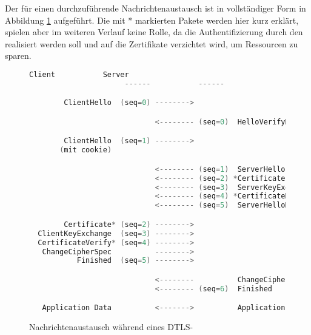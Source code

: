 Der für einen  durchzuführende Nachrichtenaustausch ist in vollständiger Form in Abbildung \ref{fig:handshake} aufgeführt.
Die mit * markierten Pakete werden hier kurz erklärt, spielen aber im weiteren Verlauf keine Rolle, da die Authentifizierung durch
den  realisiert werden soll und auf die Zertifikate verzichtet wird, um Ressourcen zu sparen.

\begin{figure}[ht]
  \centering
  \begin{lstlisting}[language=c]
                      Client           Server
                      ------           ------

        ClientHello  (seq=0) -------->

                             <-------- (seq=0)  HelloVerifyRequest    // Nur bei DTLS

        ClientHello  (seq=1) -------->                                // Nur bei DTLS
       (mit cookie)                                                   // Nur bei DTLS

                             <-------- (seq=1)  ServerHello
                             <-------- (seq=2) *Certificate
                             <-------- (seq=3)  ServerKeyExchange
                             <-------- (seq=4) *CertificateRequest
                             <-------- (seq=5)  ServerHelloDone

        Certificate* (seq=2) -------->
  ClientKeyExchange  (seq=3) -------->
  CertificateVerify* (seq=4) -------->
   ChangeCipherSpec          -------->
           Finished  (seq=5) -------->

                             <--------          ChangeCipherSpec
                             <-------- (seq=6)  Finished  

   Application Data          <------->          Application Data
  \end{lstlisting}
  \caption{Nachrichtenaustausch während eines DTLS-}
  \label{fig:handshake}
\end{figure}

